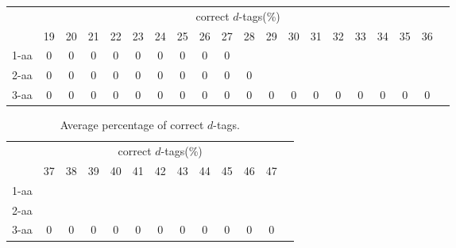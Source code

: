 \begin{table}[h]\tiny
\vspace{3mm}
{\centering
\begin{center}
\begin{tabular}{|l|c|c|c|c|c|c|c|c|c|c|c|c|c|c|c|c|c|c|c|}
  \hline
  & \multicolumn{ 18 }{|c|}{correct $d$-tags(\%)} \\
  \cline{2- 19}
    & 19 & 20 & 21 & 22 & 23 & 24 & 25 & 26 & 27 & 28 & 29 & 30 & 31 & 32 & 33 & 34 & 35 & 36\\
  \hline
1-aa  & 0 & 0 & 0 & 0 & 0 & 0 & 0 & 0 & 0 &  &  &  &  &  &  &  &  & \\
2-aa  & 0 & 0 & 0 & 0 & 0 & 0 & 0 & 0 & 0 & 0 &  &  &  &  &  &  &  & \\
3-aa  & 0 & 0 & 0 & 0 & 0 & 0 & 0 & 0 & 0 & 0 & 0 & 0 & 0 & 0 & 0 & 0 & 0 & 0\\
 \hline
\end{tabular}
\end{center}
\par}
\centering

\vspace{3mm}
\label{table:correct-d-tags}
\end{table}
\begin{table}[h]\tiny
\vspace{3mm}
{\centering
\begin{center}
\begin{tabular}{|l|c|c|c|c|c|c|c|c|c|c|c|c|}
  \hline
  & \multicolumn{ 11 }{|c|}{correct $d$-tags(\%)} \\
  \cline{2- 12}
    & 37 & 38 & 39 & 40 & 41 & 42 & 43 & 44 & 45 & 46 & 47\\
  \hline
1-aa  &  &  &  &  &  &  &  &  &  &  & \\
2-aa  &  &  &  &  &  &  &  &  &  &  & \\
3-aa  & 0 & 0 & 0 & 0 & 0 & 0 & 0 & 0 & 0 & 0 & 0\\
 \hline
\end{tabular}
\end{center}
\par}
\centering

\caption{ Average percentage of correct $d$-tags.}

\vspace{3mm}
\label{table:correct-d-tags}
\end{table}
